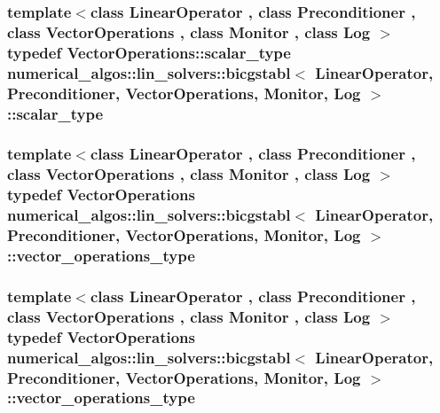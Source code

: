 \hypertarget{classnumerical__algos_1_1lin__solvers_1_1bicgstabl_a2756ac0272be9f905269641d9f74bb8e}{
\subsubsection[{scalar\-\_\-type}]{\setlength{\rightskip}{0pt plus 5cm}template$<$class Linear\-Operator , class Preconditioner , class Vector\-Operations , class Monitor , class Log $>$ typedef Vector\-Operations\-::scalar\-\_\-type {\bf numerical\-\_\-algos\-::lin\-\_\-solvers\-::bicgstabl}$<$ Linear\-Operator, Preconditioner, Vector\-Operations, Monitor, Log $>$\-::{\bf scalar\-\_\-type}}}\label{classnumerical__algos_1_1lin__solvers_1_1bicgstabl_a2756ac0272be9f905269641d9f74bb8e}
\hypertarget{classnumerical__algos_1_1lin__solvers_1_1bicgstabl_a10544b2c65e7fcf5ff71a3049c19734c}{
\subsubsection[{vector\-\_\-operations\-\_\-type}]{\setlength{\rightskip}{0pt plus 5cm}template$<$class Linear\-Operator , class Preconditioner , class Vector\-Operations , class Monitor , class Log $>$ typedef Vector\-Operations {\bf numerical\-\_\-algos\-::lin\-\_\-solvers\-::bicgstabl}$<$ Linear\-Operator, Preconditioner, Vector\-Operations, Monitor, Log $>$\-::{\bf vector\-\_\-operations\-\_\-type}}}\label{classnumerical__algos_1_1lin__solvers_1_1bicgstabl_a10544b2c65e7fcf5ff71a3049c19734c}
\hypertarget{classnumerical__algos_1_1lin__solvers_1_1bicgstabl_a10544b2c65e7fcf5ff71a3049c19734c}{
\subsubsection[{vector\-\_\-operations\-\_\-type}]{\setlength{\rightskip}{0pt plus 5cm}template$<$class Linear\-Operator , class Preconditioner , class Vector\-Operations , class Monitor , class Log $>$ typedef Vector\-Operations {\bf numerical\-\_\-algos\-::lin\-\_\-solvers\-::bicgstabl}$<$ Linear\-Operator, Preconditioner, Vector\-Operations, Monitor, Log $>$\-::{\bf vector\-\_\-operations\-\_\-type}}}\label{classnumerical__algos_1_1lin__solvers_1_1bicgstabl_a10544b2c65e7fcf5ff71a3049c19734c}
